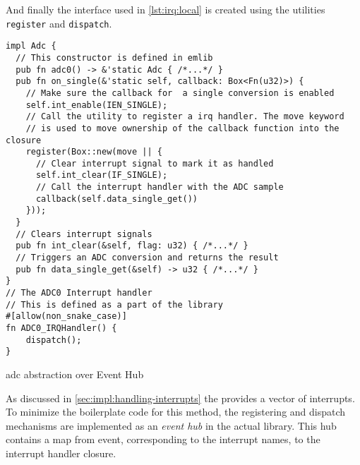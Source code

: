 And finally the interface used in \autoref{lst:irq:local} is created using the utilities \texttt{register} and \texttt{dispatch}.
\begin{listing}[H]
  \begin{verbatim}
impl Adc {
  // This constructor is defined in emlib
  pub fn adc0() -> &'static Adc { /*...*/ }
  pub fn on_single(&'static self, callback: Box<Fn(u32)>) {
    // Make sure the callback for  a single conversion is enabled
    self.int_enable(IEN_SINGLE);
    // Call the utility to register a irq handler. The move keyword
    // is used to move ownership of the callback function into the closure
    register(Box::new(move || {
      // Clear interrupt signal to mark it as handled
      self.int_clear(IF_SINGLE);
      // Call the interrupt handler with the ADC sample
      callback(self.data_single_get())
    }));
  }
  // Clears interrupt signals
  pub fn int_clear(&self, flag: u32) { /*...*/ }
  // Triggers an ADC conversion and returns the result
  pub fn data_single_get(&self) -> u32 { /*...*/ }
}
// The ADC0 Interrupt handler
// This is defined as a part of the library
#[allow(non_snake_case)]
fn ADC0_IRQHandler() {
    dispatch();
}
  \end{verbatim}
  \caption{\gls{adc} abstraction over Event Hub}
  \label{lst:adc-abstraction}
\end{listing}




As discussed in \autoref{sec:impl:handling-interrupts} the {\gecko} provides a vector of interrupts.
To minimize the boilerplate code for this method, the registering and dispatch mechanisms are implemented as an \emph{event hub} in the actual library.
This hub contains a map from event, corresponding to the interrupt names, to the interrupt handler closure.

